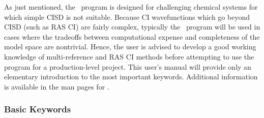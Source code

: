As just mentioned, the \PSIthree\ program is designed for challenging 
chemical systems for which simple CISD is not suitable.  Because
CI wavefunctions which go beyond CISD (such as RAS CI) are fairly complex,
typically the \PSIdetci\ program will be used in cases where the 
tradeoffs between computational expense and completeness of the 
model space are nontrivial.  Hence, the user is advised to develop
a good working knowledge of multi-reference and RAS CI methods before
attempting to use the program for a production-level project.  This user's
manual will provide only an elementary introduction to the most
important keywords.  Additional information is available in the 
man pages for \PSIdetci.

\subsubsection{Basic Keywords}
